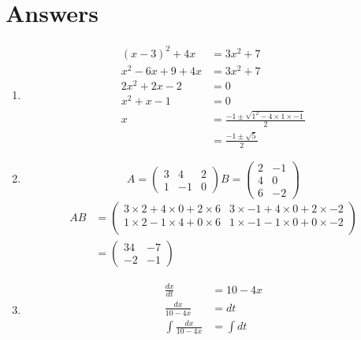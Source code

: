 \documentclass[11pt, a4paper]{article}
\begin{document}
	\section{Answers}
	\begin{enumerate}
	    \item
	    \begin{align*} %
	        (x-3)^2+4x&=3x^2+7\\ %
	        x^2-6x+9+4x&=3x^2+7\\
	        2x^2+2x-2&=0\\
	        x^2+x-1&=0\\
	        x&=\frac{-1\pm \sqrt{1^2-4\times 1\times -1}}{2}\\
	        &=\frac{-1\pm \sqrt{5}}{2}
	    \end{align*}
	    \item 
    	\begin{equation*}
        	A=\begin{pmatrix}
        		3 & 4 & 2 \\
        		1 & -1 & 0
        		\end{pmatrix}
        		B=\begin{pmatrix}
        		2 & -1 \\
        		4 & 0  \\
        		6 & -2
        	\end{pmatrix}
    	\end{equation*}
    	\begin{align*}
    	    AB&=\begin{pmatrix}
    	    3\times 2 + 4\times 0 + 2\times 6 & 
    	    3\times -1 + 4\times 0 + 2\times -2\\
    	    1\times 2 -1\times 4 + 0\times 6 &
    	    1\times -1 -1\times 0 +0\times -2\\
    	    \end{pmatrix}\\
    	    &=\begin{pmatrix}
    	    34 & -7\\
    	    -2 & -1
    	    \end{pmatrix}
    	\end{align*}
    	\item \begin{align*}
    	    \frac{dx}{dt} &= 10-4x\\
    	    \frac{dx}{10-4x} &= dt\\
    	    \int{\frac{dx}{10-4x}} &= \int{dt}\\

\end{align*}
\end{enumerate}
\end{document}
